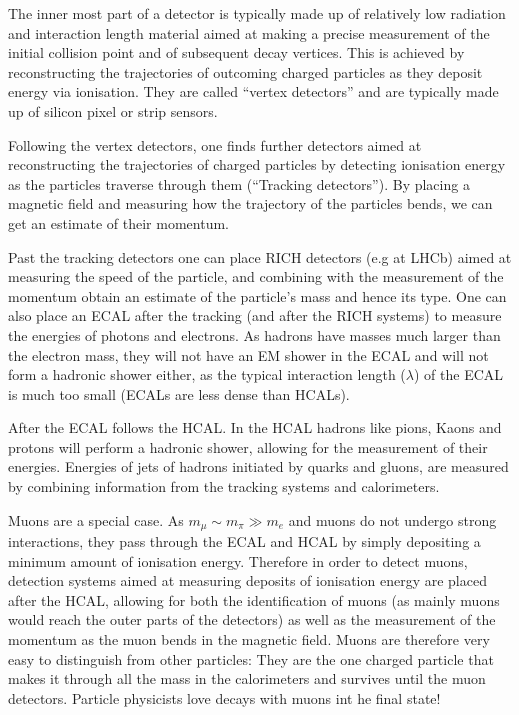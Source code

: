 The inner most part of a detector is typically made up of relatively low radiation and interaction length material aimed at making a precise measurement of the initial collision point and of subsequent decay vertices. This is achieved by reconstructing the trajectories of outcoming charged particles as they deposit energy via ionisation. They are called ``vertex detectors'' and are typically made up of silicon pixel or strip sensors. 

Following the vertex detectors, one finds further detectors aimed at reconstructing the trajectories of charged particles by detecting ionisation energy as the particles traverse through them (``Tracking detectors''). By placing a magnetic field and measuring how the trajectory of the particles bends, we can get an estimate of their momentum.

Past the tracking detectors one can place RICH detectors (e.g at LHCb) aimed at measuring the speed of the particle, and combining with the measurement of the momentum obtain an estimate of the particle's mass and hence its type. One can also place an ECAL after the tracking (and after the RICH systems) to measure the energies of photons and electrons. As hadrons have masses much larger than the electron mass, they will not have an EM shower in the ECAL and will not form a hadronic shower either, as the typical interaction length ($\lambda$) of the ECAL is much too small (ECALs are less dense than HCALs). 

After the ECAL follows the HCAL. In the HCAL hadrons like pions, Kaons and protons will perform a hadronic shower, allowing for the measurement of their energies. Energies of jets of hadrons initiated by quarks and gluons, are measured by combining information from the tracking systems and calorimeters.

Muons are a special case. As $m_\mu\sim m_\pi\gg m_e$ and muons do not undergo strong interactions, they pass through the ECAL and HCAL by simply depositing a minimum amount of ionisation energy. Therefore in order to detect muons, detection systems aimed at measuring deposits of ionisation energy are placed after the HCAL, allowing for both the identification of muons (as mainly muons would reach the outer parts of the detectors) as well as the measurement of the momentum as the muon bends in the magnetic field. Muons are therefore very easy to distinguish from other particles: They are the one charged particle that makes it through all the mass in the calorimeters and survives until the muon detectors. Particle physicists love decays with muons int he final state!

